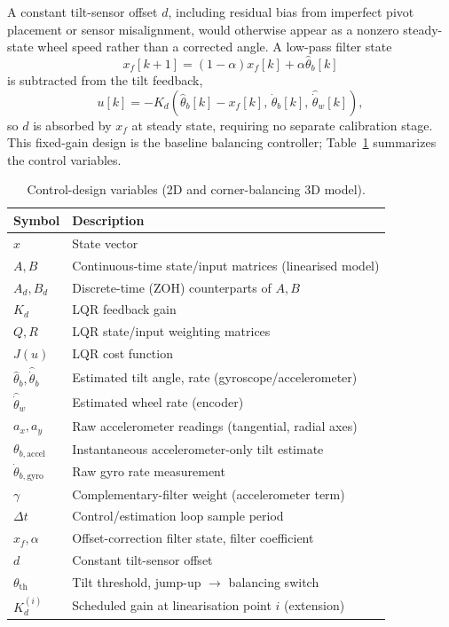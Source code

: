 A constant tilt-sensor offset $d$, including residual bias from imperfect
pivot placement or sensor misalignment, would otherwise appear as a nonzero
steady-state wheel speed rather than a corrected angle. A low-pass filter
state
\begin{equation}
x_f[k+1] = (1-\alpha)x_f[k] + \alpha\hat\theta_b[k]
\end{equation}
is subtracted from the tilt feedback,
\begin{equation}
u[k] = -K_d(\hat\theta_b[k]-x_f[k],\, \hat{\dot\theta}_b[k],\, \hat{\dot\theta}_w[k]),
\end{equation}
so $d$ is absorbed by $x_f$ at steady state, requiring no separate calibration
stage. This fixed-gain design is the baseline balancing controller;
Table~\ref{tab:control2d_vars} summarizes the control variables.

\begin{table}[htbp]
\centering
\caption[Control-design variables]{Control-design variables (2D and corner-balancing 3D model).}
\label{tab:control2d_vars}
\begin{tabular}{ll}
\toprule
Symbol & Description \\
\midrule
$x$ & State vector \\
$A, B$ & Continuous-time state/input matrices (linearised model) \\
$A_d, B_d$ & Discrete-time (ZOH) counterparts of $A, B$ \\
$K_d$ & LQR feedback gain \\
$Q, R$ & LQR state/input weighting matrices \\
$J(u)$ & LQR cost function \\
$\hat\theta_b, \hat{\dot\theta}_b$ & Estimated tilt angle, rate (gyroscope/accelerometer) \\
$\hat{\dot\theta}_w$ & Estimated wheel rate (encoder) \\
$a_x, a_y$ & Raw accelerometer readings (tangential, radial axes) \\
$\theta_{b,\text{accel}}$ & Instantaneous accelerometer-only tilt estimate \\
$\dot\theta_{b,\text{gyro}}$ & Raw gyro rate measurement \\
$\gamma$ & Complementary-filter weight (accelerometer term) \\
$\Delta t$ & Control/estimation loop sample period \\
$x_f, \alpha$ & Offset-correction filter state, filter coefficient \\
$d$ & Constant tilt-sensor offset \\
$\theta_{\text{th}}$ & Tilt threshold, jump-up $\to$ balancing switch \\
$K_d^{(i)}$ & Scheduled gain at linearisation point $i$ (extension) \\
\bottomrule
\end{tabular}
\end{table}

